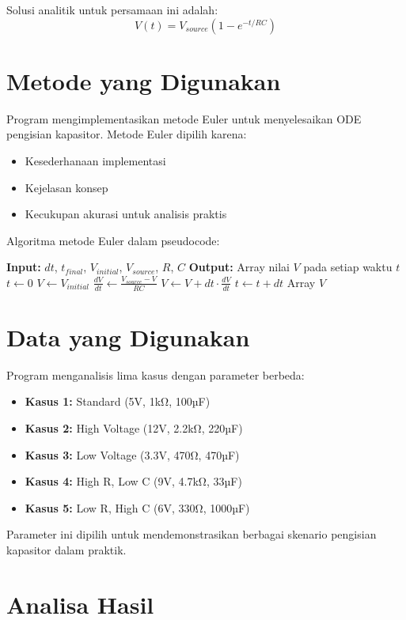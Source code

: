 \documentclass[conference]{IEEEtran}
\begin{document}
Solusi analitik untuk persamaan ini adalah:
\[V(t) = V_{source}(1 - e^{-t/RC})\]

\section{Metode yang Digunakan}
Program mengimplementasikan metode Euler untuk menyelesaikan ODE pengisian kapasitor. Metode Euler dipilih karena:
\begin{itemize}
\item Kesederhanaan implementasi
\item Kejelasan konsep
\item Kecukupan akurasi untuk analisis praktis
\end{itemize}

Algoritma metode Euler dalam pseudocode:
\begin{algorithmic}
\STATE \textbf{Input:} $dt$, $t_{final}$, $V_{initial}$, $V_{source}$, $R$, $C$
\STATE \textbf{Output:} Array nilai $V$ pada setiap waktu $t$
\STATE $t \leftarrow 0$
\STATE $V \leftarrow V_{initial}$
    \STATE $\frac{dV}{dt} \leftarrow \frac{V_{source} - V}{RC}$
    \STATE $V \leftarrow V + dt \cdot \frac{dV}{dt}$
    \STATE $t \leftarrow t + dt$
\ENDWHILE
\RETURN Array $V$
\end{algorithmic}

\section{Data yang Digunakan}
Program menganalisis lima kasus dengan parameter berbeda:
\begin{itemize}
\item \textbf{Kasus 1:} Standard (5V, 1kΩ, 100µF)
\item \textbf{Kasus 2:} High Voltage (12V, 2.2kΩ, 220µF)
\item \textbf{Kasus 3:} Low Voltage (3.3V, 470Ω, 470µF)
\item \textbf{Kasus 4:} High R, Low C (9V, 4.7kΩ, 33µF)
\item \textbf{Kasus 5:} Low R, High C (6V, 330Ω, 1000µF)
\end{itemize}

Parameter ini dipilih untuk mendemonstrasikan berbagai skenario pengisian kapasitor dalam praktik.

\section{Analisa Hasil}
\end{document}

